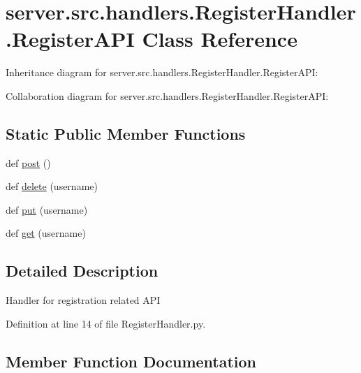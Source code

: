 \hypertarget{classserver_1_1src_1_1handlers_1_1_register_handler_1_1_register_a_p_i}{}\section{server.\+src.\+handlers.\+Register\+Handler.\+Register\+A\+PI Class Reference}
\label{classserver_1_1src_1_1handlers_1_1_register_handler_1_1_register_a_p_i}


Inheritance diagram for server.\+src.\+handlers.\+Register\+Handler.\+Register\+A\+PI\+:


Collaboration diagram for server.\+src.\+handlers.\+Register\+Handler.\+Register\+A\+PI\+:
\subsection*{Static Public Member Functions}
\begin{DoxyCompactItemize}
\item 
def \hyperlink{classserver_1_1src_1_1handlers_1_1_register_handler_1_1_register_a_p_i_a78f7bb962fb1c8be72fb92fd5fdaa934}{post} ()
\item 
def \hyperlink{classserver_1_1src_1_1handlers_1_1_register_handler_1_1_register_a_p_i_a3e50d0c881500ea4f377ab18203b585f}{delete} (username)
\item 
def \hyperlink{classserver_1_1src_1_1handlers_1_1_register_handler_1_1_register_a_p_i_a767126e94996ed7cab3365499d35ae39}{put} (username)
\item 
def \hyperlink{classserver_1_1src_1_1handlers_1_1_register_handler_1_1_register_a_p_i_aa421d313c3f0466e48d34ea34a4f708a}{get} (username)
\end{DoxyCompactItemize}


\subsection{Detailed Description}
\begin{DoxyVerb}Handler for registration related API\end{DoxyVerb}
 

Definition at line 14 of file Register\+Handler.\+py.



\subsection{Member Function Documentation}

